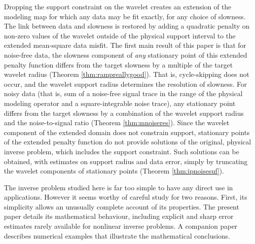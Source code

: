 Dropping the support constraint on the wavelet creates an extension of
the modeling map for which any data may be fit exactly, for any choice
of slowness. The link between data and slowness is restored by adding
a quadratic penalty on non-zero values of the wavelet outside of the
physical support interval to the extended mean-square data misfit. The
first main result of this paper is that for noise-free data, the
slowness component of {\em any} stationary point of this extended
penalty function differs from the target slowness by a multiple of the
target wavelet radius (Theorem \ref{thm:rampreallygood}). That is, cycle-skipping does not occur, and the
wavelet support radius determines the resolution of slowness. For
noisy data (that is, sum of a noise-free signal trace in the range of
the physical modeling operator and a square-integrable noise trace),
any stationary point differs from the target slowness by a combination
of the wavelet support radius and the noise-to-signal ratio (Theorem \ref{thm:mnoiseres}). Since the
wavelet component of the extended domain does not constrain support,
stationary points of the extended penalty function do not provide
solutions of the original, physical inverse problem, which includes
the support constraint. Such solutions can be obtained, with estimates
on support radius and data error, simply by truncating the wavelet
components of stationary points (Theorem \ref{thm:ipnoisesuf}).
  
The inverse problem studied here is far too simple to have any direct
use in applications. However it seems worthy of careful study for two
reasons. First, its simplicity allows an unusually complete account of
its properties. The present paper details its mathematical behaviour,
including explicit and sharp error estimates rarely available for nonlinear
inverse problems. A companion paper \cite[]{SymesChenMinkoff:21}
describes numerical examples that illustrate the mathematical
conclusions.

